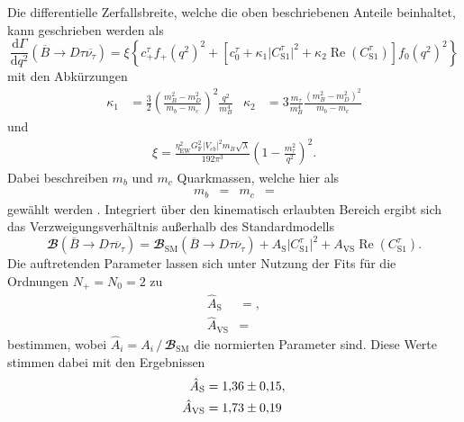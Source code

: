 Die differentielle Zerfallsbreite, welche die oben beschriebenen Anteile beinhaltet, kann geschrieben werden als \cite{PhysRevD.88.094012}
\begin{equation}
  \label{eqn:wq_bsm}
  \frac{\mathrm{d} \Gamma}{\mathrm{d} q^2} \left(\overline{B} \to D \tau \overline{\nu_{\tau}} \right) = \xi \left\lbrace c_+^{\tau} f_+(q^2)^2 + \left\lbrack c_0^{\tau} + \kappa_1 \lvert C_{\text{S}1}^{\tau} \rvert^2 + \kappa_2 \operatorname{Re}(C_{\text{S}1}^{\tau}) \right\rbrack f_0(q^2)^2 \right\rbrace
\end{equation}
mit den Abkürzungen
\begin{align*}
  \kappa_1 &= \frac{3}{2} \left( \frac{m_B^2 - m_D^2}{m_b - m_c} \right)^2 \frac{q^2}{m_B^4} & \kappa_2 &= 3  \frac{m_\tau}{m_B^4} \frac{(m_B^2 - m_D^2)^2}{m_b - m_c}
\end{align*}
und
\begin{align*}
  \xi = \frac{\eta_\text{EW}^2 G_\text{F}^2 \lvert V_{cb} \rvert^2 m_B \sqrt{\lambda} }{192 \pi^3} \left( 1 - \frac{m_\tau^2}{q^2} \right)^2.
\end{align*}
Dabei beschreiben $m_b$ und $m_c$ Quarkmassen, welche hier als 
\begin{align*}
  m_b &=  & m_c &= 
\end{align*}
gewählt werden \cite{Agashe:2014kda}.
Integriert über den kinematisch erlaubten Bereich ergibt sich das Verzweigungsverhältnis außerhalb des Standardmodells
\begin{equation}
  \label{eqn:R_bsm}
  {\mathbfcal{B}}\!\left(\overline{B} \to D \tau \overline{\nu}_\tau \right) = {\mathbfcal{B}}_\text{SM}\!\left(\overline{B} \to D \tau \overline{\nu}_\tau \right) + A_\text{S} \lvert C_{\text{S}1}^{\tau} \rvert^2 + A_{\text{VS}} \operatorname{Re}(C_{\text{S}1}^{\tau}).
\end{equation}
Die auftretenden Parameter lassen sich unter Nutzung der Fits für die Ordnungen $N_+ = N_0 = \num{2}$ zu
\begin{align*}
  \hat{A}_\text{S} &= , \\
  \hat{A}_{\text{VS}} &= 
\end{align*}
bestimmen, wobei $\hat{A}_i = A_i \,/\, {\mathbfcal{B}}_\text{SM}$ die normierten Parameter sind.
Diese Werte stimmen dabei mit den Ergebnissen
\begin{align*}
  \hat{A}_\text{S} &= \num{1.36+-0.15}, \\
  \hat{A}_{\text{VS}} &= \num{1.73+-0.19}
\end{align*}
